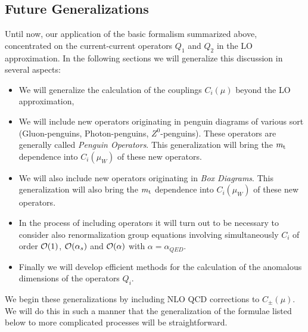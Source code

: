 \documentclass[12pt,rotate]{article}
\def\as{\alpha_s}
\newcommand{\mt}{m_{\rm t}}
\newcommand{\ord}{{\cal O}}
\begin{document}
\begin{itemize}
\begin{itemize}
\begin{itemize}
\subsection{Future Generalizations}

Until now, our application of the basic formalism summarized above,
concentrated on the current-current operators $Q_1$ and $Q_2$ in the
LO approximation. In the following sections we will generalize this
discussion in several aspects:

\begin{itemize}
\item
We will generalize the calculation of the couplings $C_i(\mu)$ beyond
the LO approximation,
\item
We will include new operators originating in penguin diagrams 
of various sort (Gluon-penguins, Photon-penguins, $Z^0$-penguins).
These operators are generally called {\it Penguin Operators}. This
generalization will bring the $\mt$ dependence into $C_i(\mu_W)$
of these new operators.
\item
We will also include new operators originating in {\it Box Diagrams}. 
This generalization will also bring the $\mt$ dependence into $C_i(\mu_W)$
of these new operators.
\item
In the process of including operators it will turn out to be necessary
to consider also renormalization group equations involving simultaneously
$C_i$ of order  $\ord (1)$,  $\ord (\as)$ and $\ord(\alpha)$ with
$\alpha=\alpha_{QED}$.
\item
Finally we will develop efficient methods for the calculation of the
anomalous dimensions of the operators $Q_i$.
\end{itemize}

We begin these generalizations by including
NLO QCD corrections to $C_\pm (\mu)$. We will do this in such a manner
that the generalization of the formulae listed below to more complicated
processes will be straightforward.


\end{itemize}
\end{itemize}
\end{itemize}
\end{document}
